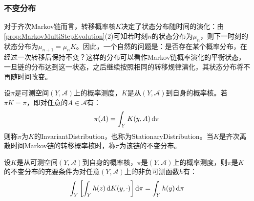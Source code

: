\subsubsection{不变分布}
对于齐次Markov链而言，转移概率核$K$决定了状态分布随时间的演化：由\cref{prop:MarkovMultiStepEvolution}(2)可知若时刻$n$的状态分布为$\mu_n$，则下一时刻的状态分布为$\mu_{n+1}=\mu_nK$。因此，一个自然的问题是：是否存在某个概率分布，在经过一次转移后保持不变？这样的分布可以看作Markov链概率演化的平衡状态，一旦链的分布达到这一状态，之后继续按照相同的转移规律演化，其状态分布将不再随时间改变。
\begin{definition}
	设$\pi$是可测空间$(Y,\mathscr{A})$上的概率测度，$K$是从$(Y,\mathscr{A})$到自身的概率核。若$\pi K=\pi$，即对任意的$A\in\mathscr{A}$有：
	\begin{equation*}
		\pi(A)=\int_{Y}K(y,A)\mathop{}\!\mathrm{d}\pi
	\end{equation*}
	则称$\pi$为$K$的\gls{InvariantDistribution}，也称为\gls{StationaryDistribution}。当$K$是齐次离散时间Markov链的转移概率核时，称$\pi$为该链的不变分布。
\end{definition}
\begin{theorem}\label{theo:InvariantDistributionIntegral}
	设$K$是从可测空间$(Y,\mathscr{A})$到自身的概率核，$\pi$是$(Y,\mathscr{A})$上的概率测度，则$\pi$是$K$的不变分布的充要条件为对任意$(Y,\mathscr{A})$上的非负可测函数$h$有：
	\begin{equation*}
		\int_{Y}\left[\int_{Y}h(z)\mathop{}\!\mathrm{d} K(y,\cdot)\right]\mathop{}\!\mathrm{d}\pi=\int_{Y}h(y)\mathop{}\!\mathrm{d}\pi
	\end{equation*}
\end{theorem}
